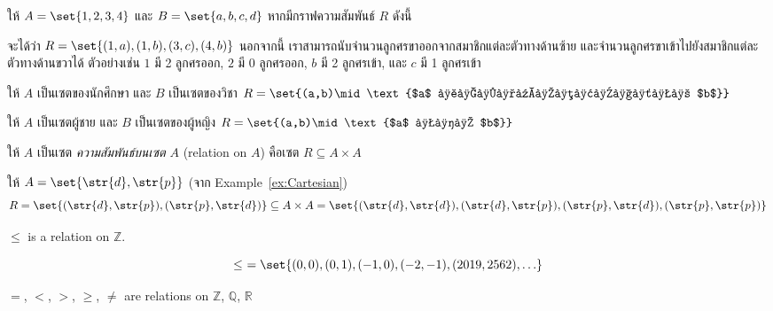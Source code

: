 \begin{example}
ให้ $A=\set{1,2,3,4}$ และ $B=\set{a,b,c,d}$ \enskip หากมีกราฟความสัมพันธ์ $R$ ดังนี้
\begin{center}
\end{center}
จะได้ว่า $R=\set{(1,a),(1,b),(3,c),(4,b)}$ \enskip นอกจากนี้ เราสามารถนับจำนวนลูกศรขาออกจากสมาชิกแต่ละตัวทางด้านซ้าย และจำนวนลูกศรขาเข้าไปยังสมาชิกแต่ละตัวทางด้านขวาได้ ตัวอย่างเช่น $1$ มี 2 ลูกศรออก, $2$ มี 0 ลูกศรออก, $b$ มี 2 ลูกศรเข้า, และ $c$ มี 1 ลูกศรเข้า
\end{example}

\begin{example}
ให้ $A$ เป็นเซตของนักศึกษา และ $B$ เป็นเซตของวิชา \enskip $R=\set{(a,b)\mid\text{$a$ ลงทะเบียนวิชา $b$}}$
\end{example}

\begin{example}
ให้ $A$ เป็นเซตผู้ชาย และ $B$ เป็นเซตของผู้หญิง \enskip $R=\set{(a,b)\mid\text{$a$ ชอบ $b$}}$
\end{example}

\begin{definition}
ให้ $A$ เป็นเซต \enskip \emph{ความสัมพันธ์บนเซต $A$} (relation on $A$) คือเซต $R\subseteq A\times A$
\end{definition}
%
\begin{example}
ให้ $A=\set{\str{d},\str{p}}$ (จาก Example~\ref{ex:Cartesian}) \enskip \[R=\set{(\str{d},\str{p}),(\str{p},\str{d})}\subseteq A\times A=\set{(\str{d},\str{d}),(\str{d},\str{p}),(\str{p},\str{d}),(\str{p},\str{p})}\]
\end{example}
%
\begin{example}
$\leq$ is a relation on $\mathbb{Z}$.

\[\leq\ =\set{(0,0),(0,1),(-1,0),(-2,-1),(2019,2562),\ldots}\]
\end{example}

\begin{example}
$=$, $<$, $>$, $\geq$, $\neq$ are relations on $\mathbb{Z}$, $\mathbb{Q}$, $\mathbb{R}$
\end{example}

